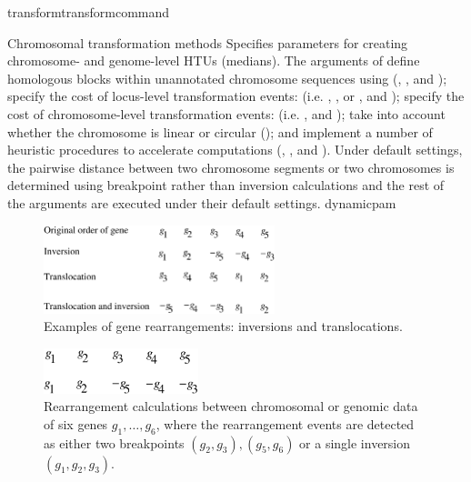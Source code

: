 \begin{command}{transform}{transformcommand}
\begin{arguments}
\begin{argumentgroup}{Chromosomal transformation methods}
            {Specifies parameters for creating chro\-mosome- and genome-level HTUs (medians).
            The arguments of  define homologous blocks within unannotated chromosome sequences using
            (, , and ); specify the cost
            of locus-level transformation events: (i.e.
            , , or ,
            and );  specify the cost of chromosome-level transformation events: 
            (i.e. , and ); 
            take into account whether the chromosome is linear or circular (); and implement a number of heuristic
            procedures to accelerate computations (, , and ).
            Under default settings, the pairwise distance between two chromosome segments or two chromosomes is determined 
            using breakpoint rather than inversion calculations and the rest of the arguments are executed under their default settings.}
            {dynamicpam}

		 \begin{figure} [!htbp]
   		 \begin{center}
        		\includegraphics[width=0.6\textwidth]{doc/figures/genomeRearrangement.pdf}
    		\end{center}
    		 \caption{Examples of gene rearrangements: inversions and translocations.}
		 \label{fig:genomeRearrangement}
		\end{figure}

		\begin{figure}[!htbp]
		\begin{center}
        		\includegraphics[width=0.4\textwidth]{doc/figures/breakpointDis.pdf}
      		\end{center}
		  \caption{Rearrangement calculations between chromosomal or genomic data of six genes $g_1, \ldots, g_6$,
                 	 where the rearrangement events are detected as either two breakpoints $(g_2, g_3), (g_5, g_6)$
                   or a single inversion $(g_1, g_2, g_3)$.}
                   \label{fig:distance}
		\end{figure}
		

\end{argumentgroup}
\end{arguments}
\end{command}
